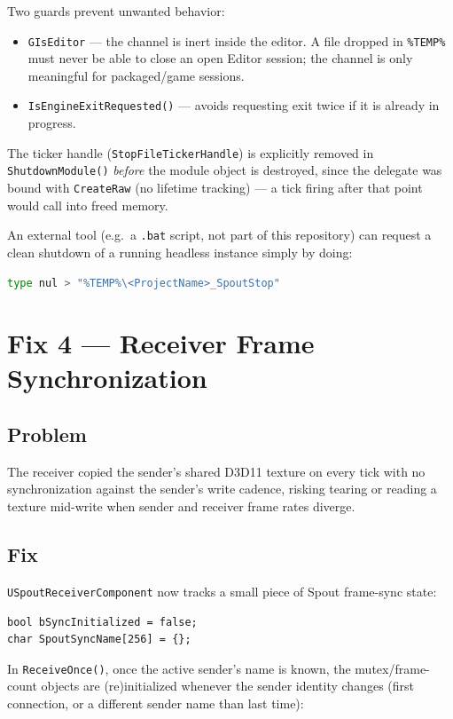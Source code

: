 \documentclass[11pt,a4paper]{article}
\begin{document}
Two guards prevent unwanted behavior:
\begin{itemize}
    \item \texttt{GIsEditor} --- the channel is inert inside the editor.
        A file dropped in \texttt{\%TEMP\%} must never be able to close an
        open Editor session; the channel is only meaningful for
        packaged/game sessions.
    \item \texttt{IsEngineExitRequested()} --- avoids requesting exit twice
        if it is already in progress.
\end{itemize}

The ticker handle (\texttt{StopFileTickerHandle}) is explicitly removed in
\texttt{ShutdownModule()} \emph{before} the module object is destroyed,
since the delegate was bound with \texttt{CreateRaw} (no lifetime
tracking) --- a tick firing after that point would call into freed memory.

An external tool (e.g.\ a \texttt{.bat} script, not part of this
repository) can request a clean shutdown of a running headless instance
simply by doing:
\begin{lstlisting}[language=bash]
type nul > "%TEMP%\<ProjectName>_SpoutStop"
\end{lstlisting}

\section{Fix 4 --- Receiver Frame Synchronization}
\label{sec:frame-sync}

\subsection{Problem}
The receiver copied the sender's shared D3D11 texture on every tick with
no synchronization against the sender's write cadence, risking tearing or
reading a texture mid-write when sender and receiver frame rates diverge.

\subsection{Fix}
\texttt{USpoutReceiverComponent} now tracks a small piece of Spout
frame-sync state:

\begin{lstlisting}[style=cpp]
bool bSyncInitialized = false;
char SpoutSyncName[256] = {};
\end{lstlisting}

In \texttt{ReceiveOnce()}, once the active sender's name is known, the
mutex/frame-count objects are (re)initialized whenever the sender identity
changes (first connection, or a different sender name than last time):
\end{document}
